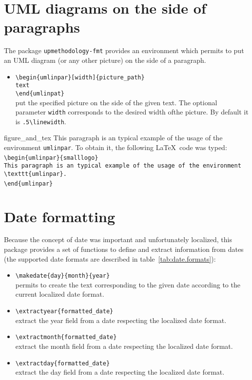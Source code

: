 \documentclass[book]{upmethodology-document}
\begin{document}
\section{UML diagrams on the side of paragraphs}

The package \texttt{upmethodology-fmt} provides an environment which permits to put an UML diagram (or any other picture) on the side of a paragraph.

\begin{itemize}
\item \texttt{{\textbackslash}begin\{umlinpar\}[width]\{picture\_path\}}\\\texttt{text}\\\texttt{{\textbackslash}end\{umlinpat\}} \\
	put the specified picture on the side of the given text. The optional parameter \texttt{width} corresponds to the desired width ofthe picture. By default it is \texttt{.5{\textbackslash}linewidth}.
\end{itemize}

\begin{umlinpar}{figure_and_tex}
	This paragraph is an typical example of the usage of the environment \texttt{umlinpar}. To obtain it, the following \LaTeX\ code was typed: \\
\texttt{{\textbackslash}begin\{umlinpar\}\{smalllogo\}} \\
\texttt{This paragraph is an typical example of the usage of the environment {\textbackslash}texttt\{umlinpar\}.} \\
\texttt{{\textbackslash}end\{umlinpar\}} \\
\end{umlinpar}

\section{Date formatting}

Because the concept of date was important and unfortunately localized, this package provides a set of functions to define and extract information from dates (the supported date formats are described in table~\ref{tab:date.formats}):

\begin{itemize}
\item \texttt{{\textbackslash}makedate\{day\}\{month\}\{year\}}\\
permits to create the text corresponding to the given date according to the current localized date format.
\item \texttt{{\textbackslash}extractyear\{formatted\_date\}}\\
extract the year field from a date respecting the localized date format.
\item \texttt{{\textbackslash}extractmonth\{formatted\_date\}}\\
extract the month field from a date respecting the localized date format.
\item \texttt{{\textbackslash}extractday\{formatted\_date\}}\\
extract the day field from a date respecting the localized date format.
\end{itemize}
\end{document}
